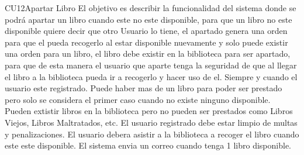 
	\begin{UseCase}{CU12}{Apartar Libro}{
		El objetivo es describir la funcionalidad del sistema donde se podrá apartar un libro cuando este no este disponible, para que un libro no este disponible quiere decir que otro Usuario lo tiene, el apartado genera una orden para que el pueda recogerlo al estar disponible nuevamente y solo puede existir una orden para un libro, el libro debe existir en la biblioteca para ser apartado, para que de esta manera el usuario que aparte tenga la seguridad de que al llegar el libro a la biblioteca pueda ir a recogerlo y hacer uso de el. Siempre y cuando el usuario este registrado. Puede haber mas de un libro para poder ser prestado pero solo se considera el primer caso cuando no existe ninguno disponible. Pueden extistir libros en la biblioteca pero no pueden ser prestados como Libros Viejos, Libros Maltratados, etc. El usuario registrado debe estar limpio de multas y penalizaciones. El usuario debera asistir a la biblioteca a recoger el libro cuando este este disponible. El sistema envia un correo cuando tenga 1 libro disponible.
	}
		
	\end{UseCase}
